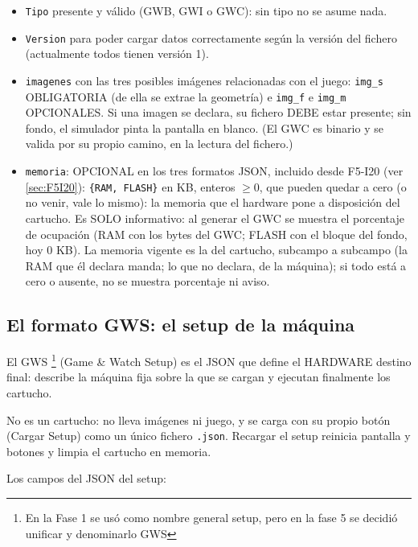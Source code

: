 \begin{itemize}
	\item \texttt{Tipo} presente y válido (GWB, GWI o GWC): sin tipo no se
	asume nada.

	\item \texttt{Version} para poder cargar datos correctamente según la versión del fichero (actualmente todos tienen versión 1).

	\item \texttt{imagenes} con las tres posibles imágenes relacionadas con el juego: \texttt{img\_s} OBLIGATORIA (de ella se extrae la geometría) e \texttt{img\_f} e \texttt{img\_m} OPCIONALES. Si una imagen se declara, su fichero DEBE estar presente; sin fondo, el simulador pinta la pantalla en blanco. (El GWC es binario y se valida por su propio camino, en la lectura del fichero.)
	
	\item \texttt{memoria}: OPCIONAL en los tres formatos JSON, incluido
	desde F5-I20 (ver \ref{sec:F5I20}): \texttt{\{RAM, FLASH\}} en
	KB, enteros $\ge 0$, que pueden quedar a cero (o no venir, vale lo
	mismo): la memoria que el hardware pone a disposición del cartucho.
	Es SOLO informativo: al generar el GWC se muestra el porcentaje de
	ocupación (RAM con los bytes del GWC; FLASH con el bloque del fondo,
	hoy 0 KB). La memoria vigente es la del cartucho, subcampo a subcampo
	(la RAM que él declara manda; lo que no declara, de la máquina); si
	todo está a cero o ausente, no se muestra porcentaje ni aviso.
\end{itemize}

\subsection*{El formato GWS: el setup de la máquina}
\label{sec:F1A01GWS}

El GWS \footnote{En la Fase 1 se usó como nombre general setup, pero en la fase 5 se decidió unificar y denominarlo GWS} (Game \& Watch Setup) es el JSON que define el HARDWARE destino final: describe la
máquina fija sobre la que se cargan y ejecutan finalmente los cartucho. 

No es un cartucho: no lleva imágenes ni juego, y se carga con su propio botón (Cargar
Setup) como un único fichero \texttt{.json}. Recargar el setup
reinicia pantalla y botones y limpia el cartucho en memoria.

Los campos del JSON del setup:

